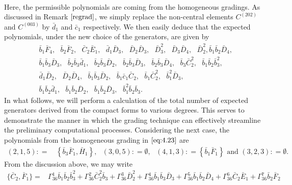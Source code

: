 \documentclass[10pt]{amsart}
\theoremstyle{definition}
\theoremstyle{corollary}
\theoremstyle{remark}
\theoremstyle{conclusion}
\begin{document}
\begin{align*}
\end{align*} Here, the permissible polynomials are coming from the homogeneous gradings. As discussed in Remark $\ref{regrad}$, we simply replace the non-central elements $C^{(202)}$ and $C^{(003)}$ by $\bar{d}_1$ and $\bar{c}_1$ respectively.  We then easily deduce that the expected polynomials, under the new choice of the generators, are given by \begin{align*}
  & \,  \bar{b}_1 \bar{F}_4, \text{ } \bar{b}_2 \bar{F}_2,\text{ }\bar{C}_2 \bar{E}_1,\text{ }\bar{d}_1 \bar{D}_3,\text{ }\bar{D}_2 \bar{D}_3,\text{ }\bar{D}_3^2,\text{ }\bar{D}_3 \bar{D}_4,\text{ }\bar{D}_2^2,\bar{b}_1 \bar{b}_2 \bar{D}_4,\\
  & \,\bar{b}_1 \bar{b}_3 \bar{D}_3,\text{ }\bar{b}_2 \bar{b}_3 \bar{d}_1,\text{ }\bar{b}_2 \bar{b}_3 \bar{D}_2,\text{ }\bar{b}_2 \bar{b}_3 \bar{D}_3,\text{ }\bar{b}_2 \bar{b}_3 \bar{D}_4,\text{ }\bar{b}_3 \bar{C}_2^2,\text{ }\bar{b}_1 \bar{b}_2 \bar{b}_3^2,\\
  & \, \bar{d}_1 \bar{D}_2,\text{ }\bar{D}_2 \bar{D}_4,\text{ }\bar{b}_1 \bar{b}_3 \bar{D}_2,\text{ }\bar{b}_1 \bar{c}_1 \bar{C}_2,\text{ }\bar{b}_1 \bar{C}_2^2,\text{ }\bar{b}_1^2 \bar{D}_3,\\
  & \,\bar{b}_1 \bar{b}_2 \bar{d}_1,\text{ }\bar{b}_1 \bar{b}_2 \bar{D}_2,\text{ }\bar{b}_1 \bar{b}_2 \bar{D}_3,\text{ }\bar{b}_1^2 \bar{b}_2 \bar{b}_3.
\end{align*}  In what follows, we will perform a calculation of the total number of expected generators derived from the compact forms to various degrees. This serves to demonstrate the manner in which the grading technique can effectively streamline the preliminary computational processes. Considering the next case, the polynomials from the homogeneous grading in $ \eqref{eq:4.23}$ are    \begin{align*}
     (2,1,5) : = & \, \left\{\bar{b}_3\bar{F}_1, \bar{H}_1   \right\}  , \text{  } (3,0,5) : =  \emptyset , \text{ } (4,1,3) : = \left\{\bar{b}_1  \bar{F}_1\right\} \text{ and }  (3,2,3) : =   \emptyset .
\end{align*} From the discussion above, we may write \begin{align}
    \{\bar{C}_2, \bar{F}_{1}\}=& \Gamma_{36}^1\bar{b}_1\bar{b}_2\bar{b}_3^2+ \Gamma_{36}^2\bar{C}_2^2 \bar{b}_3+ \Gamma_{36}^3 \bar{D}_2^2+\Gamma_{36}^4 \bar{b}_1 \bar{b}_3\bar{D}_3+ \Gamma_{36}^5 \bar{b}_1\bar{b}_2\bar{D}_4+\Gamma_{36}^6 \bar{C}_2\bar{E}_1+  \Gamma_{36}^7 \bar{b}_2\bar{F}_2 \nonumber \\

\end{align}
\end{document}
